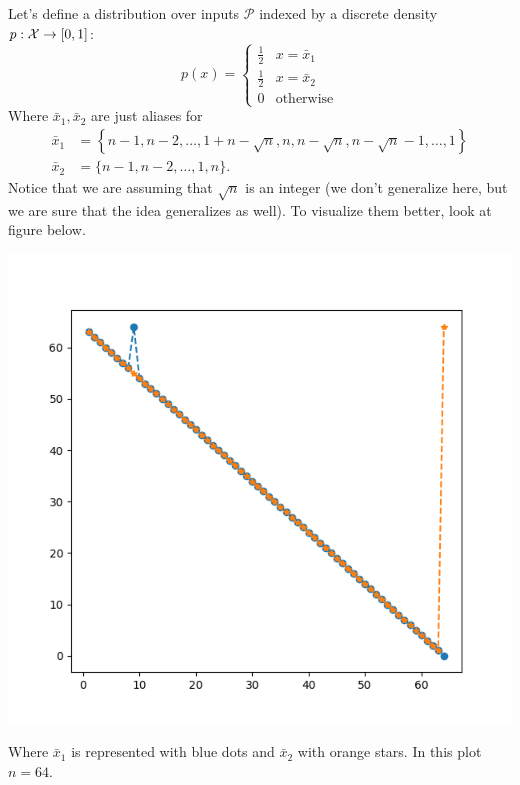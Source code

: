 \documentclass[11pt]{article}
\begin{document}
\begin{enumerate}
    Let's define a distribution over inputs $\mathcal{P}$ indexed by a discrete density $p:\mathcal{X} \to [0,1]$:
    \begin{equation}\label{Pdef}
        p(x) = \begin{cases}
            \frac{1}{2}& x = \bar{x}_1\\
            \frac{1}{2}& x = \bar{x}_2\\
            0 & \text{otherwise}
        \end{cases}
    \end{equation}
    Where $\bar x_1,\bar x_2$ are just aliases for
    \begin{align*}
        \bar x_1 &= \left\{n-1,n-2, \dots, 1 + n - \sqrt{n}, n, n -  \sqrt{n},  n - \sqrt{n} - 1, \dots, 1\right\}\\
        \bar x_2 &= \{n-1,n-2, \dots , 1, n\}.
    \end{align*}
    Notice that we are assuming that $\sqrt{n}$ is an integer (we don't generalize here, but we are sure that the idea generalizes as well). To visualize them better, look at figure below. 
    \begin{center}
        \includegraphics[scale=.5]{plot.png}
    \end{center}
    Where $\bar x_1$ is represented with blue dots and $\bar x_2$ with orange stars. In this plot $n = 64$.


\end{enumerate}
\end{document}
